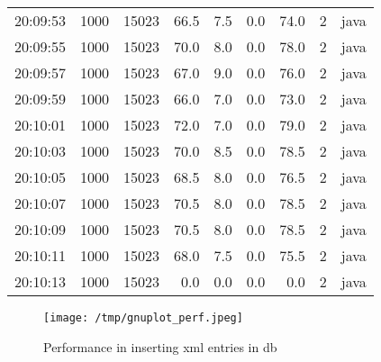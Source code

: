 \documentclass[11pt]{article}
\begin{document}
\begin{table}[htbp]
\begin{tabular}{rrrrrrrrl}
20:09:53 & 1000 & 15023 & 66.5 & 7.5 & 0.0 & 74.0 & 2 & java\\
20:09:55 & 1000 & 15023 & 70.0 & 8.0 & 0.0 & 78.0 & 2 & java\\
20:09:57 & 1000 & 15023 & 67.0 & 9.0 & 0.0 & 76.0 & 2 & java\\
20:09:59 & 1000 & 15023 & 66.0 & 7.0 & 0.0 & 73.0 & 2 & java\\
20:10:01 & 1000 & 15023 & 72.0 & 7.0 & 0.0 & 79.0 & 2 & java\\
20:10:03 & 1000 & 15023 & 70.0 & 8.5 & 0.0 & 78.5 & 2 & java\\
20:10:05 & 1000 & 15023 & 68.5 & 8.0 & 0.0 & 76.5 & 2 & java\\
20:10:07 & 1000 & 15023 & 70.5 & 8.0 & 0.0 & 78.5 & 2 & java\\
20:10:09 & 1000 & 15023 & 70.5 & 8.0 & 0.0 & 78.5 & 2 & java\\
20:10:11 & 1000 & 15023 & 68.0 & 7.5 & 0.0 & 75.5 & 2 & java\\
20:10:13 & 1000 & 15023 & 0.0 & 0.0 & 0.0 & 0.0 & 2 & java\\
\end{tabular}
\end{table}

\begin{figure}
\centering
\texttt{[image: /tmp/gnuplot\_perf.jpeg]}
\caption{Performance in inserting xml entries in db}
\end{figure}
\end{document}
